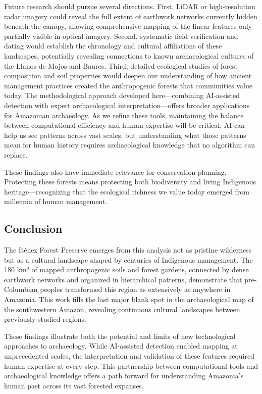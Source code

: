 \documentclass[
  letterpaper,
  DIV=11,
  numbers=noendperiod]{scrartcl}
\begin{document}
Future research should pursue several directions. First, LiDAR or
high-resolution radar imagery could reveal the full extent of earthwork
networks currently hidden beneath the canopy, allowing comprehensive
mapping of the linear features only partially visible in optical
imagery. Second, systematic field verification and dating would
establish the chronology and cultural affiliations of these landscapes,
potentially revealing connections to known archaeological cultures of
the Llanos de Mojos and Baures. Third, detailed ecological studies of
forest composition and soil properties would deepen our understanding of
how ancient management practices created the anthropogenic forests that
communities value today. The methodological approach developed
here---combining AI-assisted detection with expert archaeological
interpretation---offers broader applications for Amazonian archaeology.
As we refine these tools, maintaining the balance between computational
efficiency and human expertise will be critical. AI can help us see
patterns across vast scales, but understanding what those patterns mean
for human history requires archaeological knowledge that no algorithm
can replace.

These findings also have immediate relevance for conservation planning.
Protecting these forests means protecting both biodiversity and living
Indigenous heritage---recognizing that the ecological richness we value
today emerged from millennia of human management.

\subsection{Conclusion}\label{conclusion}

The Iténez Forest Preserve emerges from this analysis not as pristine
wilderness but as a cultural landscape shaped by centuries of Indigenous
management. The 180 km² of mapped anthropogenic soils and forest
gardens, connected by dense earthwork networks and organized in
hierarchical patterns, demonstrate that pre-Columbian peoples
transformed this region as extensively as anywhere in Amazonia. This
work fills the last major blank spot in the archaeological map of the
southwestern Amazon, revealing continuous cultural landscapes between
previously studied regions.

These findings illustrate both the potential and limits of new
technological approaches to archaeology. While AI-assisted detection
enabled mapping at unprecedented scales, the interpretation and
validation of these features required human expertise at every step.
This partnership between computational tools and archaeological
knowledge offers a path forward for understanding Amazonia's human past
across its vast forested expanses.
\end{document}
